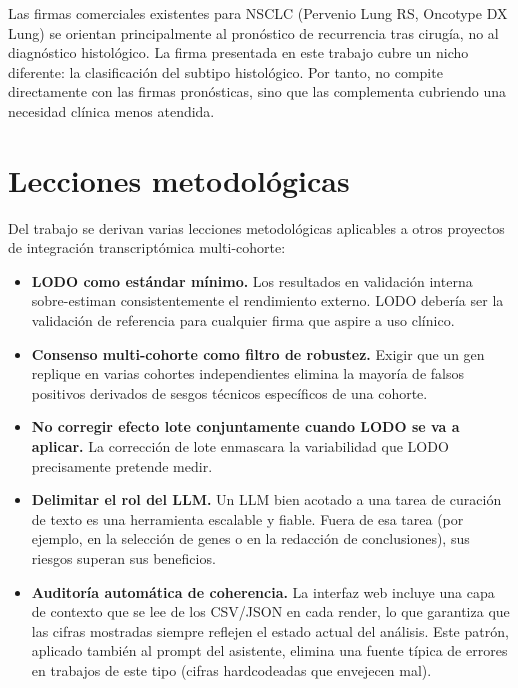 Las firmas comerciales existentes para NSCLC (Pervenio Lung RS, Oncotype
DX Lung) se orientan principalmente al pronóstico de recurrencia tras
cirugía, no al diagnóstico histológico. La firma presentada en este
trabajo cubre un nicho diferente: la clasificación del subtipo
histológico. Por tanto, no compite directamente con las firmas
pronósticas, sino que las complementa cubriendo una necesidad clínica
menos atendida.

\section{Lecciones metodológicas}
\label{sec:disc_lecciones}

Del trabajo se derivan varias lecciones metodológicas aplicables a otros
proyectos de integración transcriptómica multi-cohorte:

\begin{itemize}
  \item \textbf{LODO como estándar mínimo.} Los resultados en validación
  interna sobre-estiman consistentemente el rendimiento externo. LODO
  debería ser la validación de referencia para cualquier firma que
  aspire a uso clínico.
  \item \textbf{Consenso multi-cohorte como filtro de robustez.}
  Exigir que un gen replique en varias cohortes independientes elimina
  la mayoría de falsos positivos derivados de sesgos técnicos
  específicos de una cohorte.
  \item \textbf{No corregir efecto lote conjuntamente cuando LODO se va
  a aplicar.} La corrección de lote enmascara la variabilidad que LODO
  precisamente pretende medir.
  \item \textbf{Delimitar el rol del LLM.} Un LLM bien acotado a una
  tarea de curación de texto es una herramienta escalable y fiable.
  Fuera de esa tarea (por ejemplo, en la selección de genes o en la
  redacción de conclusiones), sus riesgos superan sus beneficios.
  \item \textbf{Auditoría automática de coherencia.} La interfaz web
  incluye una capa de contexto que se lee de los CSV/JSON en cada
  render, lo que garantiza que las cifras mostradas siempre reflejen el
  estado actual del análisis. Este patrón, aplicado también al prompt
  del asistente, elimina una fuente típica de errores en trabajos de
  este tipo (cifras hardcodeadas que envejecen mal).
\end{itemize}
